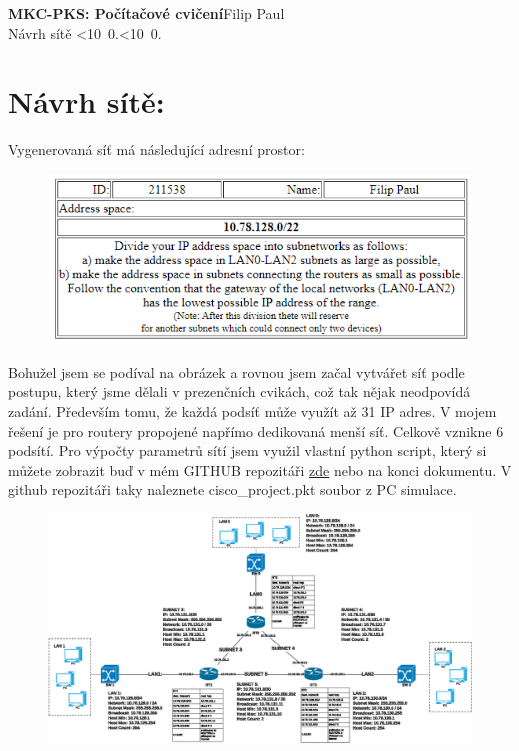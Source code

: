 \documentclass[10pt, a4paper]{article}%
\def\mydate{\leavevmode\hbox{\twodigits\day.\twodigits\month.\the\year}}
\def\twodigits#1{\ifnum#1<10 0\fi\the#1}
\begin{document}
\begin{flushleft}%
	\textbf{\Large{MKC-PKS: Počítačové cvičení}}\hfill Filip Paul\\
	\large{Návrh sítě \hfill\mydate}
	
\end{flushleft}
\section*{Návrh sítě:}
Vygenerovaná síť má následující adresní prostor:
		\begin{figure}[ht!]
			\centering
			\includegraphics[]{zadani.PNG}
		\end{figure}

Bohužel jsem se podíval na obrázek a rovnou jsem začal vytvářet síť podle postupu, který jsme dělali v prezenčních cvikách,
což tak nějak neodpovídá zadání. Především tomu, že každá podsíť může využít až 31 IP adres. V mojem řešení
je pro routery propojené napřímo dedikovaná menší síť. Celkově vznikne 6 podsítí.
Pro výpočty parametrů sítí jsem využil vlastní python script, který si můžete zobrazit buď v mém GITHUB repozitáři
\href{https://github.com/FilipPaul/ctvrtak_letni_semestr/blob/main/MKC_NSB/ukol1_kryptografie/README.md}{\color{blue} zde} nebo
na konci dokumentu. V github repozitáři taky naleznete cisco\_project.pkt soubor z PC simulace.
		\begin{figure}[ht!]
			\centering
			\includegraphics[width = 1\textwidth]{navrhSite.eps}
		\end{figure}	
\end{document}
